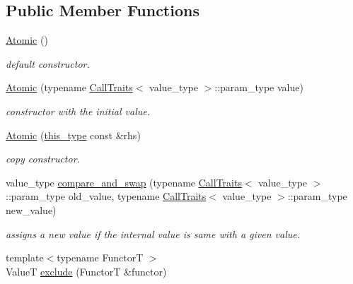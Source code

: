 \subsection*{Public Member Functions}
\begin{DoxyCompactItemize}
\item 
\hypertarget{classhryky_1_1exclusion_1_1_atomic_aa23e6ff98a0a017cb9ea60d118e4e3c0}{\hyperlink{classhryky_1_1exclusion_1_1_atomic_aa23e6ff98a0a017cb9ea60d118e4e3c0}{Atomic} ()}\label{classhryky_1_1exclusion_1_1_atomic_aa23e6ff98a0a017cb9ea60d118e4e3c0}

\begin{DoxyCompactList}\small\item\em default constructor. \end{DoxyCompactList}\item 
\hyperlink{classhryky_1_1exclusion_1_1_atomic_a090ee4942c75bdd38d2339500d3a907e}{Atomic} (typename \hyperlink{classhryky_1_1_call_traits}{Call\-Traits}$<$ value\-\_\-type $>$\-::param\-\_\-type value)
\begin{DoxyCompactList}\small\item\em constructor with the initial value. \end{DoxyCompactList}\item 
\hyperlink{classhryky_1_1exclusion_1_1_atomic_a82c68fd9ea035f8b98d63bd585de21bf}{Atomic} (\hyperlink{classhryky_1_1exclusion_1_1_atomic_writing_afc6301af19df5cf042e0cbed6d273b2a}{this\-\_\-type} const \&rhs)
\begin{DoxyCompactList}\small\item\em copy constructor. \end{DoxyCompactList}\item 
value\-\_\-type \hyperlink{group__exclusion__control_gac693764e6a7a576464f5a48e3d9816d6}{compare\-\_\-and\-\_\-swap} (typename \hyperlink{classhryky_1_1_call_traits}{Call\-Traits}$<$ value\-\_\-type $>$\-::param\-\_\-type old\-\_\-value, typename \hyperlink{classhryky_1_1_call_traits}{Call\-Traits}$<$ value\-\_\-type $>$\-::param\-\_\-type new\-\_\-value)
\begin{DoxyCompactList}\small\item\em assigns a new value if the internal value is same with a given value. \end{DoxyCompactList}\item 
{\footnotesize template$<$typename Functor\-T $>$ }\\Value\-T \hyperlink{group__exclusion__control_gadd8b9f70d3ffa0442def7fca8fe2437c}{exclude} (Functor\-T \&functor)

\end{DoxyCompactItemize}
